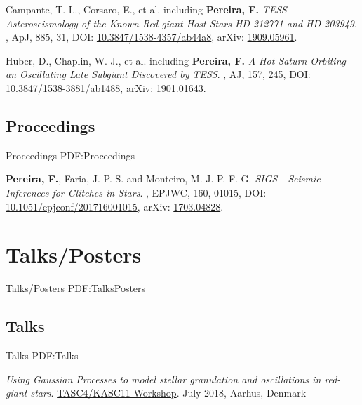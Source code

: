 \documentclass[letterpaper,10pt,oneside]{article}
\begin{document}
\begin{body}
\BulletItem
Campante, T. L., Corsaro, E., et al. including \textbf{Pereira, F.} \newline
\textit{TESS Asteroseismology of the Known Red-giant Host Stars HD 212771 and HD 203949}. , ApJ, 885, 31,
DOI: \href{https://doi.org/10.3847/1538-4357/ab44a8}{10.3847/1538-4357/ab44a8}, 
arXiv: \href{https://arxiv.org/abs/1909.05961}{1909.05961}.

\BulletItem
Huber, D., Chaplin, W. J., et al. including \textbf{Pereira, F.} \newline
\textit{A Hot Saturn Orbiting an Oscillating Late Subgiant Discovered by TESS}. , AJ, 157, 245,
DOI: \href{https://doi.org/10.3847/1538-3881/ab1488}{10.3847/1538-3881/ab1488}, 
arXiv: \href{https://arxiv.org/abs/1901.01643}{1901.01643}.

\BigGap
\subsection
{Proceedings}
{Proceedings}
{PDF:Proceedings}

\BulletItem
\textbf{Pereira, F.}, Faria, J. P. S. and Monteiro, M. J. P. F. G. \newline
\textit{SIGS - Seismic Inferences for Glitches in Stars}. , EPJWC, 160, 01015,
DOI: \href{https://doi.org/10.1051/epjconf/201716001015}{10.1051/epjconf/201716001015}, 
arXiv: \href{https://arxiv.org/abs/1703.04828}{1703.04828}.


\section
{Talks/Posters}
{Talks/Posters}
{PDF:TalksPosters}

\subsection
{Talks}
{Talks}
{PDF:Talks}

\BulletItem
\emph{Using Gaussian Processes to model stellar granulation and oscillations in red-giant stars}. \newline
\href{http://conferences.au.dk/tasc4/}{TASC4/KASC11 Workshop}. July 2018, Aarhus, Denmark


\end{body}
\end{document}
